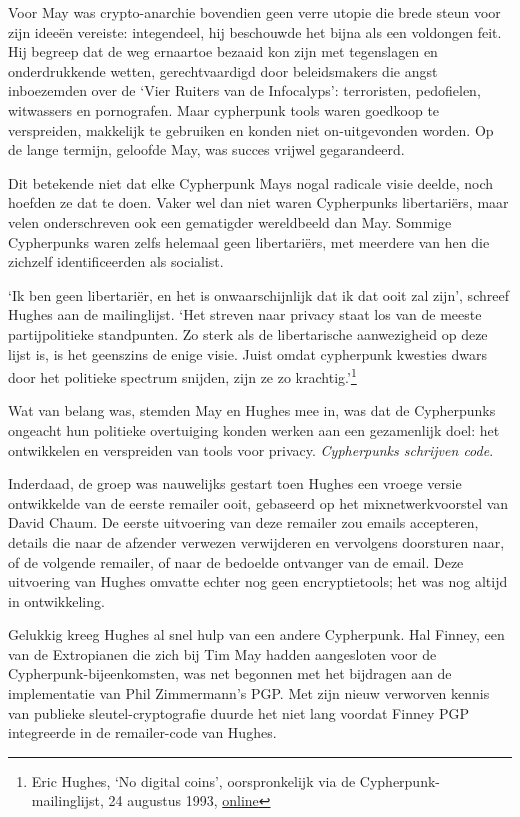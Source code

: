 \documentclass[
  a5paper,
  smalldemyvopaper,11pt,twoside,onecolumn,openright,extrafontsizes]{memoir}
\begin{document}
Voor May was crypto-anarchie bovendien geen verre utopie die brede steun
voor zijn ideeën vereiste: integendeel, hij beschouwde het bijna als een
voldongen feit. Hij begreep dat de weg ernaartoe bezaaid kon zijn met
tegenslagen en onderdrukkende wetten, gerechtvaardigd door beleidsmakers
die angst inboezemden over de `Vier Ruiters van de Infocalyps':
terroristen, pedofielen, witwassers en pornografen. Maar cypherpunk
tools waren goedkoop te verspreiden, makkelijk te gebruiken en konden
niet on-uitgevonden worden. Op de lange termijn, geloofde May, was
succes vrijwel gegarandeerd.

Dit betekende niet dat elke Cypherpunk Mays nogal radicale visie deelde,
noch hoefden ze dat te doen. Vaker wel dan niet waren Cypherpunks
libertariërs, maar velen onderschreven ook een gematigder wereldbeeld
dan May. Sommige Cypherpunks waren zelfs helemaal geen libertariërs, met
meerdere van hen die zichzelf identificeerden als socialist.

`Ik ben geen libertariër, en het is onwaarschijnlijk dat ik dat ooit zal
zijn', schreef Hughes aan de mailinglijst. `Het streven naar privacy
staat los van de meeste partijpolitieke standpunten. Zo sterk als de
libertarische aanwezigheid op deze lijst is, is het geenszins de enige
visie. Juist omdat cypherpunk kwesties dwars door het politieke spectrum
snijden, zijn ze zo krachtig.'\footnote{Eric Hughes, `No digital coins',
  oorspronkelijk via de Cypherpunk-mailinglijst, 24 augustus 1993,
  \href{https://cypherpunks.venona.com/date/1993/08/msg00690.html}{online}}

Wat van belang was, stemden May en Hughes mee in, was dat de Cypherpunks
ongeacht hun politieke overtuiging konden werken aan een gezamenlijk
doel: het ontwikkelen en verspreiden van tools voor privacy.
\emph{Cypherpunks schrijven code}.

Inderdaad, de groep was nauwelijks gestart toen Hughes een vroege versie
ontwikkelde van de eerste remailer ooit, gebaseerd op het
mixnetwerkvoorstel van David Chaum. De eerste uitvoering van deze
remailer zou emails accepteren, details die naar de afzender verwezen
verwijderen en vervolgens doorsturen naar, of de volgende remailer, of
naar de bedoelde ontvanger van de email. Deze uitvoering van Hughes
omvatte echter nog geen encryptietools; het was nog altijd in
ontwikkeling.

Gelukkig kreeg Hughes al snel hulp van een andere Cypherpunk. Hal
Finney, een van de Extropianen die zich bij Tim May hadden aangesloten
voor de Cypherpunk-bijeenkomsten, was net begonnen met het bijdragen aan
de implementatie van Phil Zimmermann's PGP. Met zijn nieuw verworven
kennis van publieke sleutel-cryptografie duurde het niet lang voordat
Finney PGP integreerde in de remailer-code van Hughes.
\end{document}
